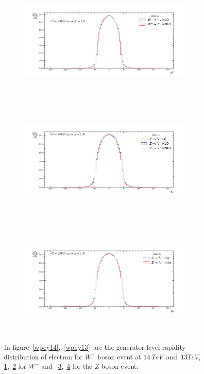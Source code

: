 \begin{figure}[H]
\begin{subfigure}{0.49\textwidth}
\vspace*{-8mm}
\caption{}
\label{wmey14}
\end{subfigure}
\begin{subfigure}{0.49\textwidth}
\includegraphics[height=6cm, width=\textwidth]{chapter4/WmYE13.pdf}
\vspace*{-8mm}
\caption{}
\label{wmey13}
\end{subfigure}
\begin{subfigure}{0.49\textwidth}
\includegraphics[height=6cm, width=\textwidth]{chapter4/ZEY14.pdf}
\vspace*{-8mm}
\caption{}
\label{zey14}
\end{subfigure}
\begin{subfigure}{0.49\textwidth}
\includegraphics[height=6cm, width=\textwidth]{chapter4/ZEY13.pdf}
\vspace*{-8mm}
\caption{}
\label{zey13}
\end{subfigure}
\caption{In figure~\ref{wpey14},~\ref{wpey13}~are the generator level rapidity distribution of electron for $W^{+}$ boson event at $14~TeV$~and~$13TeV$, \ref{wmey14},~\ref{wmey13} for $W^{-}$ and ~\ref{zey14},~\ref{zey13} for the $Z$ boson event.}  
\label{dilep}
\end{figure}


